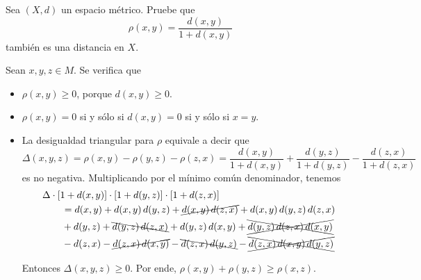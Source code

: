 \begin{exercise}
Sea $(X, d)$ un espacio métrico. Pruebe que
$$\rho(x, y) = \frac {d(x, y)} {1 + d(x, y)}$$
también es una distancia en $X$.
\end{exercise}

\begin{solution}
Sean $x, y, z \in M$. Se verifica que
\begin{itemize}
    \item $\rho(x, y) \ge 0$, porque $d(x, y) \ge 0$.
    \item $\rho(x, y) = 0$ si y sólo si $d(x, y) = 0$ si y sólo si $x = y$.
    \item La desigualdad triangular para $\rho$ equivale a decir que
    $$
    \Delta(x, y, z)
        = \rho(x, y) - \rho(y, z) - \rho(z, x)
        = \frac {d(x, y)} {1 + d(x, y)} + \frac {d(y, z)} {1 + d(y, z)} - \frac {d(z, x)} {1 + d(z, x)}
    $$
    es no negativa. Multiplicando por el mínimo común denominador, tenemos
    \begin{align*}
    & \Delta \cdot [1 + d(x,y)] \cdot [1 + d(y,z)] \cdot [1 + d(z,x)] \\
    & \qquad = d(x, y)
        +          {d(x, y) \, d(y, z)}
        + \cancel  {d(x, y) \, d(z, x)}
        +          {d(x,y) \, d(y,z) \, d(z,x)} \\
    & \qquad + d(y, z)
        + \bcancel {d(y, z) \, d(z,x)}
        +          {d(y, z) \, d(x,y)}
        + \xcancel {d(y,z) \, d(z,x) \, d(x,y)} \\
    & \qquad - d(z, x)
        - \cancel  {d(z,x) \, d(x,y)}
        - \bcancel {d(z,x) \, d(y,z)}
        - \xcancel {d(z,x) \, d(x,y) \, d(y,z)}
    \end{align*}
    
    Entonces $\Delta(x, y,z) \ge 0$. Por ende, $\rho(x, y) + \rho(y, z) \ge \rho(x, z)$.
\end{itemize}
\end{solution}
